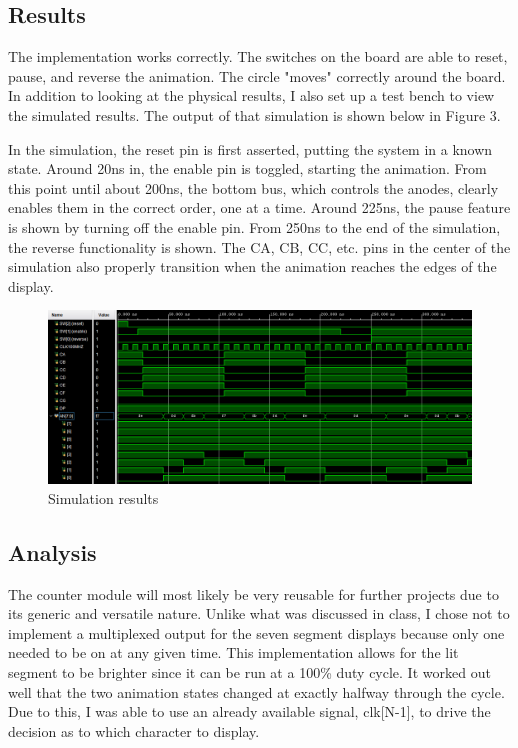 \documentclass{article}
\begin{document}
	\subsection*{Results}
	The implementation works correctly. The switches on the board are able to reset, pause, and reverse the animation. The circle "moves" correctly around the board. In addition to looking at the physical results, I also set up a test bench to view the simulated results. The output of that simulation is shown below in Figure 3.
	
	In the simulation, the reset pin is first asserted, putting the system in a known state. Around 20ns in, the enable pin is toggled, starting the animation. From this point until about 200ns, the bottom bus, which controls the anodes, clearly enables them in the correct order, one at a time. Around 225ns, the pause feature is shown by turning off the enable pin. From 250ns to the end of the simulation, the reverse functionality is shown. The CA, CB, CC, etc. pins in the center of the simulation also properly transition when the animation reaches the edges of the display.
	
	\begin{figure}[H]
		\centering
		\includegraphics[width=\linewidth]{"HW4.8.3Sim"}
		\caption{Simulation results}
		\label{fig:simResults}
	\end{figure}
	
	\subsection*{Analysis}
	The counter module will most likely be very reusable for further projects due to its generic and versatile nature. Unlike what was discussed in class, I chose not to implement a multiplexed output for the seven segment displays because only one needed to be on at any given time. This implementation allows for the lit segment to be brighter since it can be run at a 100\% duty cycle. It worked out well that the two animation states changed at exactly halfway through the cycle. Due to this, I was able to use an already available signal, clk[N-1], to drive the decision as to which character to display.
	
\end{document}
